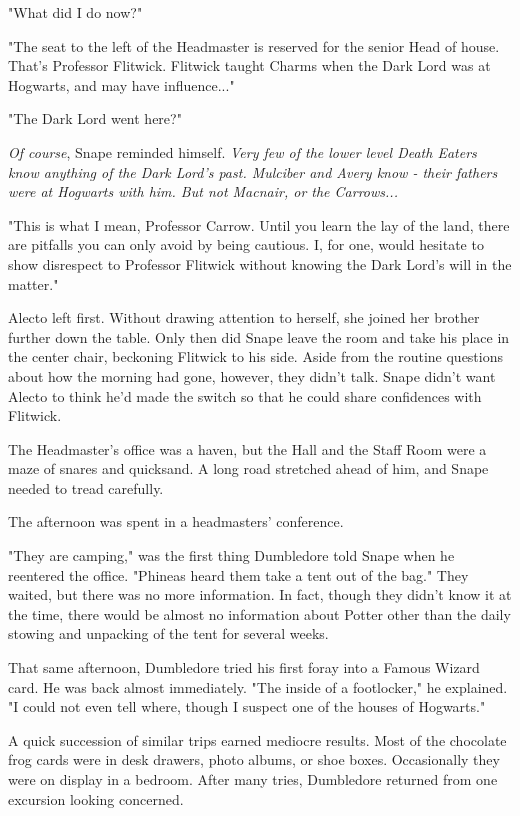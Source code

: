 \documentclass[a4paper,11pt]{article}
\begin{document}
"What did I do now?"

"The seat to the left of the Headmaster is reserved for the senior Head of house. That's Professor Flitwick. Flitwick taught Charms when the Dark Lord was at Hogwarts, and may have influence..."

"The Dark Lord went here?"

\emph{Of course}, Snape reminded himself. \emph{Very few of the lower level Death Eaters know anything of the Dark Lord's past. Mulciber and Avery know - their fathers were at Hogwarts with him. But not Macnair, or the Carrows...}

"This is what I mean, Professor Carrow. Until you learn the lay of the land, there are pitfalls you can only avoid by being cautious. I, for one, would hesitate to show disrespect to Professor Flitwick without knowing the Dark Lord's will in the matter."

Alecto left first. Without drawing attention to herself, she joined her brother further down the table. Only then did Snape leave the room and take his place in the center chair, beckoning Flitwick to his side. Aside from the routine questions about how the morning had gone, however, they didn't talk. Snape didn't want Alecto to think he'd made the switch so that he could share confidences with Flitwick.

The Headmaster's office was a haven, but the Hall and the Staff Room were a maze of snares and quicksand. A long road stretched ahead of him, and Snape needed to tread carefully.

The afternoon was spent in a headmasters' conference.

"They are camping," was the first thing Dumbledore told Snape when he reentered the office. "Phineas heard them take a tent out of the bag." They waited, but there was no more information. In fact, though they didn't know it at the time, there would be almost no information about Potter other than the daily stowing and unpacking of the tent for several weeks.

That same afternoon, Dumbledore tried his first foray into a Famous Wizard card. He was back almost immediately. "The inside of a footlocker," he explained. "I could not even tell where, though I suspect one of the houses of Hogwarts."

A quick succession of similar trips earned mediocre results. Most of the chocolate frog cards were in desk drawers, photo albums, or shoe boxes. Occasionally they were on display in a bedroom. After many tries, Dumbledore returned from one excursion looking concerned.
\end{document}
